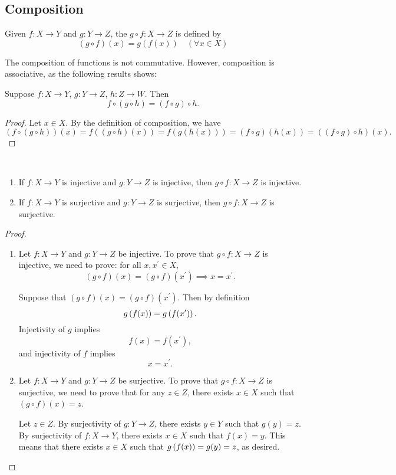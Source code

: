 \subsection{Composition}
\begin{definition}[Composition]
Given $f\colon X\to Y$ and $g\colon Y\to Z$, the  $g\circ f\colon X\to Z$ is defined by
\[ (g \circ f)(x)=g(f(x))\quad(\forall x \in X)\]
\end{definition}

The composition of functions is not commutative. However, composition is associative, as the following results shows:

\begin{proposition}
Suppose $f\colon X\to Y$, $g\colon Y\to Z$, $h\colon Z\to W$. Then
\[f\circ (g\circ h)=(f\circ g)\circ h.\]
\end{proposition}

\begin{proof}
Let $x\in X$. By the definition of composition, we have
\[(f\circ(g\circ h))(x)=f((g\circ h)(x))=f(g(h(x)))=(f\circ g)(h(x))=((f\circ g)\circ h)(x).\]
\end{proof}

\begin{proposition} \
\begin{enumerate}[label=(\roman*)]
\item If $f\colon X \to Y$ is injective and $g\colon Y \to Z$ is injective, then $g \circ f\colon X \to Z$ is injective.
\item If $f\colon X\to Y$ is surjective and $g\colon Y\to Z$ is surjective, then $g \circ f\colon X\to Z$ is surjective.
\end{enumerate}
\end{proposition}

\begin{proof} \
\begin{enumerate}[label=(\roman*)]
\item Let $f\colon X \to Y$ and $g\colon Y \to Z$ be injective. To prove that $g \circ f\colon X\to Z$ is injective, we need to prove: for all $x,x^\prime\in X$, 
\[(g \circ f)(x)=(g\circ f)(x^\prime) \implies x=x^\prime.\]

Suppose that $(g \circ f)(x) = (g \circ f)(x^\prime)$. Then by definition
\[g\left(f(x)\right)=g\left(f(x^\prime)\right).\]
Injectivity of $g$ implies
\[f(x)=f(x^\prime),\]
and injectivity of $f$ implies
\[x=x^\prime.\]

\item Let $f\colon X\to Y$ and $g\colon Y\to Z$ be surjective. To prove that $g\circ f\colon X\to Z$ is surjective, we need to prove that for any $z\in Z$, there exists $x\in X$ such that $(g\circ f)(x)=z$.

Let $z\in Z$. By surjectivity of $g\colon Y\to Z$, there exists $y\in Y$ such that $g(y)=z$. By surjectivity of $f\colon X\to Y$, there exists $x\in X$ such that $f(x)=y$. This means that there exists $x\in X$ such that $g\left(f(x)\right)=g(y)=z$, as desired.
\end{enumerate}
\end{proof}

